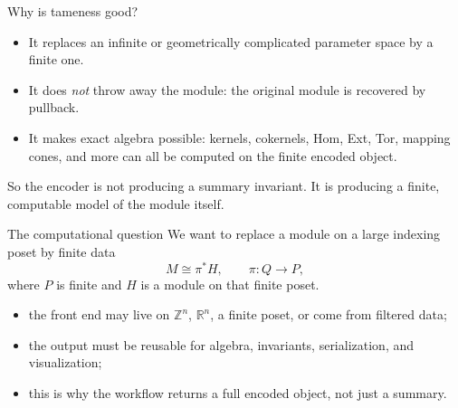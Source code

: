 \documentclass[aspectratio=169,11pt]{beamer}
\newcommand{\R}{\mathbb{R}}
\newcommand{\Z}{\mathbb{Z}}
\begin{document}
\begin{frame}{Why is tameness good?}	

	\begin{itemize}
		\item It replaces an infinite or geometrically complicated parameter space by a finite one.
		\item It does \emph{not} throw away the module: the original module is recovered by pullback.
		\item It makes exact algebra possible: kernels, cokernels, Hom, Ext, Tor, mapping cones, and more can all be computed on the finite encoded object.
	\end{itemize}
	
	\vspace{0.5em}
	So the encoder is not producing a summary invariant. It is producing a
	finite, computable model of the module itself.
\end{frame}

\begin{frame}{The computational question}
\small
We want to replace a module on a large indexing poset by finite data
\[
M \cong \pi^* H,
\qquad
\pi:Q\to P,
\]
where $P$ is finite and $H$ is a module on that finite poset.

\medskip
\begin{itemize}
  \item the front end may live on $\Z^n$, $\R^n$, a finite poset, or come from filtered data;
  \item the output must be reusable for algebra, invariants, serialization, and visualization;
  \item this is why the workflow returns a full encoded object, not just a summary.
\end{itemize}

\medskip
\centering
{}
\end{frame}
\end{document}
